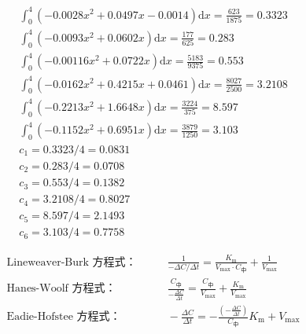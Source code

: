 \documentclass[x11names,a4paper]{article}
\begin{document}



\begin{align}
    \int_0^4 (-0.0028x^2+0.0497x -0.0014)\mathrm{d}x = \frac{623}{1875} = 0.3323 \\
    \int_0^4 (-0.0093x^2+0.0602x)\mathrm{d}x = \frac{177}{625} =0.283 \\
    \int_0^4 (-0.00116x^2+0.0722x)\mathrm{d}x = \frac{5183}{9375} =0.553\\
    \int_0^4 (-0.0162x^2+0.4215x+0.0461)\mathrm{d}x = \frac{8027}{2500} = 3.2108 \\
    \int_0^4 (-0.2213x^2+1.6648x)\mathrm{d}x = \frac{3224}{375} =8.597\\
    \int_0^4 (-0.1152x^2+0.6951x)\mathrm{d}x = \frac{3879}{1250} =3.103 \\
    c_1 = 0.3323/4 = 0.0831 \\
    c_2 = 0.283/4 = 0.0708 \\
    c_3 = 0.553/4 = 0.1382 \\
    c_4 = 3.2108/4 = 0.8027 \\
    c_5 = 8.597/4 = 2.1493 \\
    c_6 = 3.103/4 = 0.7758 
\end{align}

\[
        \begin{aligned}
            \text{Lineweaver-Burk 方程式：} & \qquad \frac{1}{-\Delta C/\Delta t}=\frac{K_{\mathrm{m}}}{V_{\mathrm{max}}\cdot C_{\text{中}} }+\frac{1}{V_{\mathrm{max}}}\\
            \text{Hanes-Woolf 方程式：} & \qquad \frac{C_{\text{中}}}{-\frac{\Delta C}{\Delta t}}=\frac{C_{\text{中}}}{V_{\mathrm{max}}}+\frac{K_{\mathrm{m}}}{V_{\mathrm{max}}}\\
            \text{Eadie-Hofstee 方程式：} & \qquad -\frac{\Delta C}{\Delta t}=-\frac{\left(-\frac{\Delta C}{\Delta t}\right)}{C_\text{中}}{K_{\mathrm{m}} + V_{\mathrm{max}}}
        \end{aligned}
    \]
\end{document}
